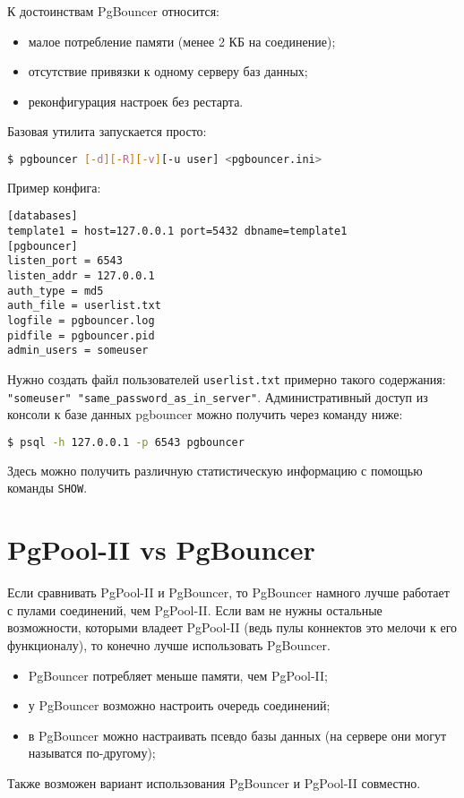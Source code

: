 К достоинствам PgBouncer относится:

\begin{itemize}
  \item малое потребление памяти (менее 2 КБ на соединение);
  \item отсутствие привязки к одному серверу баз данных;
  \item реконфигурация настроек без рестарта.
\end{itemize}

Базовая утилита запускается просто:

\begin{lstlisting}[language=Bash,label=lst:pgbouncer1,caption=PgBouncer]
$ pgbouncer [-d][-R][-v][-u user] <pgbouncer.ini>
\end{lstlisting}

Пример конфига:

\begin{lstlisting}[label=lst:pgbouncer2,caption=PgBouncer]
[databases]
template1 = host=127.0.0.1 port=5432 dbname=template1
[pgbouncer]
listen_port = 6543
listen_addr = 127.0.0.1
auth_type = md5
auth_file = userlist.txt
logfile = pgbouncer.log
pidfile = pgbouncer.pid
admin_users = someuser
\end{lstlisting}

Нужно создать файл пользователей \lstinline!userlist.txt! примерно такого содержания: \lstinline!"someuser" "same_password_as_in_server"!. Административный  доступ из консоли к базе данных pgbouncer можно получить через команду ниже:

\begin{lstlisting}[language=Bash,label=lst:pgbouncer3,caption=PgBouncer]
$ psql -h 127.0.0.1 -p 6543 pgbouncer
\end{lstlisting}

Здесь можно получить различную статистическую информацию с помощью команды \lstinline!SHOW!.


\section{PgPool-II vs PgBouncer}

Если сравнивать PgPool-II и PgBouncer, то PgBouncer намного лучше работает с пулами соединений, чем PgPool-II. Если вам не нужны остальные возможности, которыми владеет PgPool-II (ведь пулы коннектов это мелочи к его функционалу), то конечно лучше использовать PgBouncer.

\begin{itemize}
  \item PgBouncer потребляет меньше памяти, чем PgPool-II;
  \item у PgBouncer возможно настроить очередь соединений;
  \item в PgBouncer можно настраивать псевдо базы данных (на сервере они могут называтся по-другому);
\end{itemize}

Также возможен вариант использования PgBouncer и PgPool-II совместно.